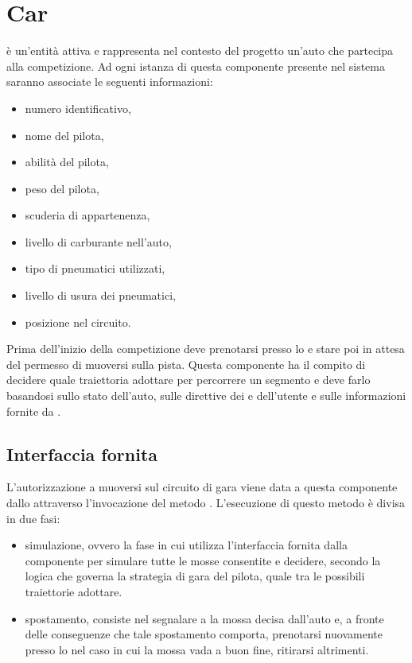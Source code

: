 \section{Car}
\car{} è un'entità attiva e rappresenta nel contesto del progetto un'auto che partecipa alla competizione. Ad ogni istanza di questa componente presente nel sistema saranno associate le seguenti informazioni:
\begin{itemize}
\item numero identificativo,
\item nome del pilota,
\item abilità del pilota,
\item peso del pilota,
\item scuderia di appartenenza,
\item livello di carburante nell'auto,
\item tipo di pneumatici utilizzati,
\item livello di usura dei pneumatici,
\item posizione nel circuito.
\end{itemize}
Prima dell'inizio della competizione \car{} deve prenotarsi presso lo \sched{} e stare poi in attesa del permesso di muoversi sulla pista.
Questa componente ha il compito di decidere quale traiettoria adottare per percorrere un segmento e deve farlo basandosi sullo stato dell'auto, sulle direttive dei \team{} e dell'utente e sulle informazioni fornite da \track{}.

\subsection*{Interfaccia fornita}
L'autorizzazione a muoversi sul circuito di gara viene data a questa componente dallo \sched{} attraverso l'invocazione del metodo . L'esecuzione di questo metodo è divisa in due fasi:
\begin{itemize}
\item simulazione, ovvero la fase in cui \car{} utilizza l'interfaccia fornita dalla componente \track{} per simulare tutte le mosse consentite e decidere, secondo la logica che governa la strategia di gara del pilota, quale tra le possibili traiettorie adottare.
\item spostamento, consiste nel segnalare a \track{} la mossa decisa dall'auto e, a fronte delle conseguenze che tale spostamento comporta, prenotarsi nuovamente presso lo \sched{} nel caso in cui la mossa vada a buon fine, ritirarsi altrimenti.
\end{itemize}

